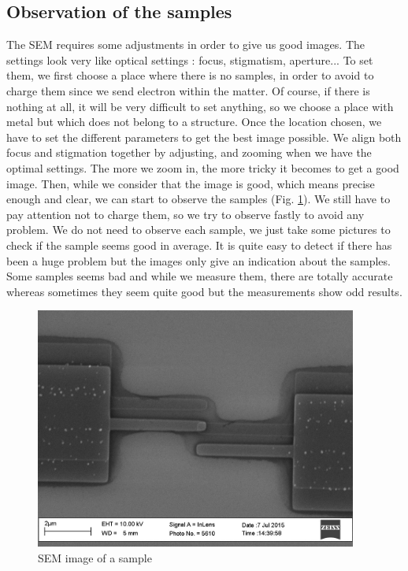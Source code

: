         \subsection{Observation of the samples}
            The SEM requires some adjustments in order to give us good images. The settings look very like optical settings : focus, stigmatism, aperture... To set them, we first choose a place where there is no samples, in order to avoid to charge them since we send electron within the matter. Of course, if there is nothing at all, it will be very difficult to set anything, so we choose a place with metal but which does not belong to a structure. Once the location chosen, we have to set the different parameters to get the best image possible. We align both focus and stigmation together by adjusting, and zooming when we have the optimal settings. The more we zoom in, the more tricky it becomes to get a good image. Then, while we consider that the image is good, which means precise enough and clear, we can start to observe the samples (Fig. \ref{SEMexemple}). We still have to pay attention not to charge them, so we try to observe fastly to avoid any problem. We do not need to observe each sample, we just take some pictures to check if the sample seems good in average. It is quite easy to detect if there has been a huge problem but the images only give an indication about the samples. Some samples seems bad and while we measure them, there are totally accurate whereas sometimes they seem quite good but the measurements show odd results. 
            
            \begin{figure}[H]
                \centering
                \includegraphics[width=300pt]{SEMexemple.jpg}
                \caption{SEM image of a sample}
                \label{SEMexemple}
            \end{figure}
            
